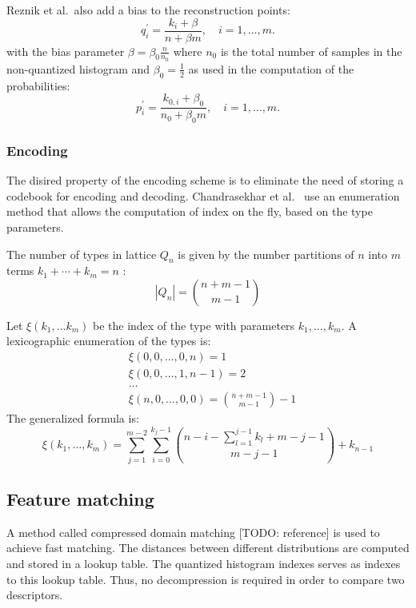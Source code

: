 Reznik et al.\ also add a bias to the reconstruction points:
\begin{equation}
    q_i^\prime = \frac{k_i + \beta}{n + \beta m}, \quad i = 1,\ldots,m.
\end{equation}
with the bias parameter $\beta = \beta_0\frac{n}{n_0}$ where $n_0$ is the total number of samples in the non-quantized histogram and $\beta_0 = \frac{1}{2}$ as used in the computation of the probabilities:
\begin{equation}
    p_i^\prime = \frac{k_{0,i} + \beta_0}{n_0 + \beta_0 m}, \quad i = 1,\ldots,m.
\end{equation}

\subsubsection{Encoding}

The disired property of the encoding scheme is to eliminate the need of storing a codebook for encoding and decoding. Chandrasekhar et al.\ \cite{chog2011} use an enumeration method that allows the computation of index on the fly, based on the type parameters.

The number of types in lattice $Q_n$ is given by the number partitions of $n$ into $m$ terms $k_1 + \cdots  + k_m = n$ \cite{chog2011}:
\begin{equation}
\left|Q_n\right| = {n+m-1 \choose m-1}
\end{equation}

Let $\xi(k_1, \ldots k_m)$ be the index of the type with parameters $k_1, \ldots, k_m$. A lexicographic enumeration of the types is:
\begin{align*}
&\xi(0,0,\ldots,0,n) = 1 \\
&\xi(0,0,\ldots,1,n-1) = 2 \\
&\ldots \\
&\xi(n,0,\ldots,0,0) = {n+m-1 \choose m-1} - 1
\end{align*}
The generalized formula \cite{chog2011} is:
\begin{equation}
\xi(k_1, \ldots, k_m) = \sum_{j=1}^{m-2} \sum_{i=0}^{k_j - 1} {n-i-\sum_{l=1}^{j-1}k_l+m-j-1 \choose m-j-1} + k_{n-1}
\end{equation}

\subsection{Feature matching}

A method called compressed domain matching [TODO: reference] is used to achieve fast matching. The distances between different distributions are computed and stored in a lookup table. The quantized histogram indexes serves as indexes to this lookup table. Thus, no decompression is required in order to compare two descriptors.
